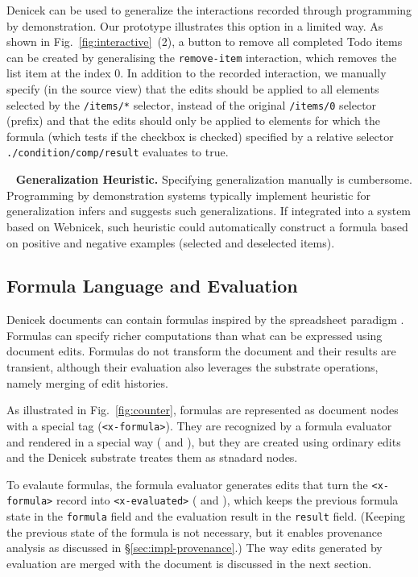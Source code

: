 \documentclass[sigconf,anonymous,screen]{acmart}
\newcommand*\circled[1]{\textnormal{\footnotesize\sffamily\bfseries\protect\tikz[baseline=(char.base)]{
  \node[shape=circle,fill=black,text=white,draw,inner sep=1pt] (char) {#1};}}}
\DeclareRobustCommand{\keyideabox}[3]{\begin{tcolorbox}[breakable,
  boxsep=5pt,left=0pt,right=0pt,top=0pt,bottom=0pt,width=\dimexpr\columnwidth\relax,
  colback=gray!20,colframe=gray!20,
  enlarge bottom by=0pt,enlarge top by=0pt,
  arc=0pt,outer arc=0pt]
\lettrine[lraise=0.3]{\LARGE #1}{~}
\small \textbf{#2.} #3
\end{tcolorbox}
}
\begin{document}
Denicek can be used to generalize the interactions recorded through programming by
demonstration. Our prototype illustrates this option in a limited way. As shown in
Fig.~\ref{fig:interactive}~(2), a button to remove all completed Todo items can be created by
generalising the {\small\Verb_remove-item_} interaction, which removes the list item at the index 0.
In addition to the recorded interaction, we manually specify (in the source view) that the edits
should be applied to all elements selected by the {\small\Verb_/items/*_} selector, instead of
the original {\small\Verb_/items/0_} selector (prefix) and that the edits should only be
applied to elements for which the formula (which tests if the checkbox is checked) specified by a
relative selector {\small\Verb_./condition/comp/result_} evaluates to true.

\keyideabox{\faMagic}{Generalization Heuristic}{Specifying generalization manually is cumbersome.
Programming by demonstration systems typically implement heuristic for generalization
\cite{myers-2000-intelligence} infers and suggests such generalizations. If integrated into
a system based on Webnicek, such heuristic could automatically construct a formula
based on positive and negative examples \cite{gulwani-2014-flash} (selected and deselected items).}


\subsection{Formula Language and Evaluation}
\label{sec:impl-eval}

Denicek documents can contain formulas inspired by the spreadsheet
paradigm \cite{nardi-1990-spreadsheets}. Formulas can specify richer computations than
what can be expressed using document edits. Formulas do not transform the document and their
results are transient, although their evaluation also leverages the substrate operations,
namely merging of edit histories.

As illustrated in Fig.~\ref{fig:counter}, formulas are represented as document nodes with a
special tag ({\small\Verb_<x-formula>_}). They are recognized by a formula evaluator and
rendered in a special way (\circled{1} and \circled{4}), but they are created using ordinary
edits and the Denicek substrate treates them as stnadard nodes.

To evalaute formulas, the formula evaluator generates edits that turn the {\small\Verb_<x-formula>_}
record into {\small\Verb_<x-evaluated>_} (\circled{2} and \circled{3}), which keeps the previous
formula state in the {\small\Verb_formula_} field and the evaluation result in the {\small\Verb_result_} field.
(Keeping the previous state of the formula is not necessary, but it enables provenance analysis
as discussed in \S\ref{sec:impl-provenance}.) The way edits generated by evaluation are merged
with the document is discussed in the next section.
\end{document}
